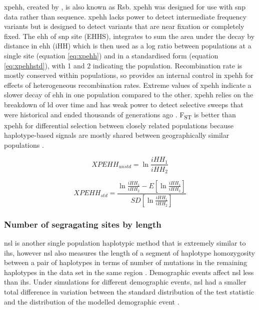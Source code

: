 \documentclass[]{report}
\begin{document}
\Gls{xpehh}, created by \citet{tang2007new}, is also known as Rsb.
\Gls{xpehh} was designed for use with \gls{snp} data rather than
sequence. \Gls{xpehh} lacks power to detect intermediate frequency
variants but is designed to detect variants that are near fixation or
completely fixed. The \gls{ehh} of \gls{snp} site (EHHS), integrates to
sum the area under the decay by distance in \gls{ehh} (iHH) which is
then used as a log ratio between populations at a single site (equation
\eqref{eq:xpehh}) and in a standardised form (equation \eqref{eq:xpehhstd}),
with 1 and 2 indicating the population. Recombination rate is mostly
conserved within populations, so provides an internal control in
\gls{xpehh} for effects of heterogeneous recombination rates. Extreme
values of \gls{xpehh} indicate a slower decay of \gls{ehh} in one
population compared to the other. \Gls{xpehh} relies on the breakdown of
\gls{ld} over time and has weak power to detect selective sweeps that
were historical and ended thousands of generations ago \citep{Chen2010}.
F\textsubscript{ST} is better than \gls{xpehh} for differential
selection between closely related populations because haplotype-based
signals are mostly shared between geographically similar populations
\citep{pickrell2009signals}.

\begin{equation} 
 XPEHH_{unstd} = \ln{\frac{iHH_1}{iHH_2}}
\label{eq:xpehh}
\end{equation}

\begin{equation} 
 XPEHH_{std} = \frac{\ln{\frac{iHH_1}{iHH_2}} - E [ \ln{\frac{iHH_1}{iHH_2}} ]}{ SD [ \ln{\frac{iHH_1}{iHH_2}} ]}
\label{eq:xpehhstd}
\end{equation}

\subsubsection{Number of segragating sites by
length}\label{number-of-segragating-sites-by-length}

\Glsdesc{nsl} is another single population haplotypic method that is
extremely similar to \gls{ihs}, however \gls{nsl} also measures the
length of a segment of haplotype homozygosity between a pair of
haplotypes in terms of number of mutations in the remaining haplotypes
in the data set in the same region \citep{Ferrer-Admetlla2014}.
Demographic events affect \gls{nsl} less than \gls{ihs}. Under
simulations for different demographic events, \gls{nsl} had a smaller
total difference in variation between the standard distribution of the
test statistic and the distribution of the modelled demographic event
\citep{Ferrer-Admetlla2014}.
\end{document}
